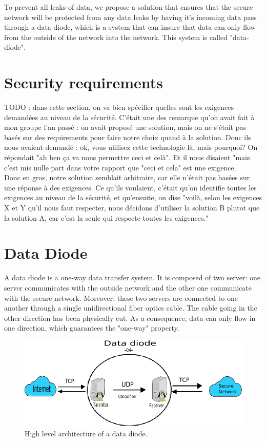 \documentclass[a4paper,11pt]{article}
\begin{document}
To prevent all leaks of data, we propose a solution that ensures that the secure network will be protected from any data leaks by having it's incoming data pass through a data-diode, which is a system that can insure that data can only flow from the outside of the network into the network. This system is called "data-diode".

\section{Security requirements}
TODO : dans cette section, on va bien spécifier quelles sont les exigences demandées au niveau de la sécurité. C'était une des remarque qu'on avait fait à mon groupe l'an passé : on avait proposé une solution, mais on ne s'était pas basés sur des requirements pour faire notre choix quand à la solution. Donc ils nous avaient demandé : ok, vous utilisez cette technologie là, mais pourquoi? On répondait "ah ben ça va nous permettre ceci et celà". Et il nous disaient "mais c'est mis nulle part dans votre rapport que "ceci et cela" est une exigence.\\

Donc en gros, notre solution semblait arbitraire, car elle n'était pas basées sur une réponse à des exigences. Ce qu'ils voulaient, c'était qu'on identifie toutes les exigences au niveau de la sécurité, et qu'ensuite, on dise "voilà, selon les exigences X et Y qu'il nous faut respecter, nous décidons d'utiliser la solution B plutot que la solution A, car c'est la seule qui respecte toutes les exigences."

\section{Data Diode}
A data diode is a one-way data transfer system. It is composed of two server: one server communicates with the outside network and the other one communicate with the secure network. Moreover, these two servers are connected to one another through a single unidirectional fiber optics cable. The cable going in the other direction has been physically cut. As a consequence, data can only flow in one direction, which guarantees the "one-way" property.

\begin{figure}
	\includegraphics[scale=0.7]{img/network.png}
	\caption{High level architecture of a data diode.}
\end{figure}
\end{document}
